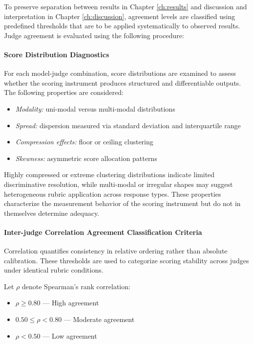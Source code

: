 To preserve separation between results in Chapter \ref{ch:results} and discussion and interpretation in Chapter \ref{ch:discussion}, agreement levels are classified using predefined thresholds that are to be applied systematically to observed results. Judge agreement is evaluated using the following procedure:

\paragraph{Score Distribution Diagnostics}
For each model-judge combination, score distributions are examined to assess whether the scoring instrument produces structured and differentiable outputs. The following properties are considered:
    \begin{itemize}[nosep]
        \item \textit{Modality:} uni-modal versus multi-modal distributions
        \item \textit{Spread:} dispersion measured via standard deviation and interquartile range
        \item \textit{Compression effects:} floor or ceiling clustering
        \item \textit{Skewness:} asymmetric score allocation patterns
    \end{itemize}
    
Highly compressed or extreme clustering distributions indicate limited discriminative resolution, while multi-modal or irregular shapes may suggest heterogeneous rubric application across response types. These properties characterize the measurement behavior of the scoring instrument but do not in themselves determine adequacy.

\paragraph{Inter-judge Correlation Agreement Classification Criteria}
Correlation quantifies consistency in relative ordering rather than absolute calibration. These thresholds are used to categorize scoring stability across judges under identical rubric conditions.

Let $\rho$ denote Spearman's rank correlation:
\begin{itemize}[nosep]
    \item $\rho \geq 0.80$ — High agreement
    \item $0.50 \leq \rho < 0.80$ — Moderate agreement
    \item $\rho < 0.50$ — Low agreement
\end{itemize}

